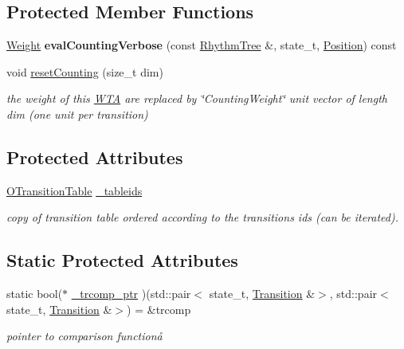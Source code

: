 \subsection*{Protected Member Functions}
\begin{DoxyCompactItemize}
\item 
\mbox{\hyperlink{classWeight}{Weight}} {\bfseries eval\+Counting\+Verbose} (const \mbox{\hyperlink{classRhythmTree}{Rhythm\+Tree}} \&, state\+\_\+t, \mbox{\hyperlink{classPosition}{Position}}) const
\item 
void \mbox{\hyperlink{group__schemata_ga5c94f5191975a32e951e7d39ac606dc0}{reset\+Counting}} (size\+\_\+t dim)
\begin{DoxyCompactList}\small\item\em the weight of this \mbox{\hyperlink{classWTA}{W\+TA}} are replaced by \char`\"{}\+Counting\+Weight\char`\"{} unit vector of length dim (one unit per transition) \end{DoxyCompactList}\end{DoxyCompactItemize}
\subsection*{Protected Attributes}
\begin{DoxyCompactItemize}
\item 
\mbox{\label{classCountingWTA_afb1577fedda586fb3c97df730b8d4100}} 
\mbox{\hyperlink{group__schemata_ga34fd7500c532fc3af1419927d6102bb4}{O\+Transition\+Table}} \mbox{\hyperlink{classCountingWTA_afb1577fedda586fb3c97df730b8d4100}{\+\_\+tableids}}
\begin{DoxyCompactList}\small\item\em copy of transition table ordered according to the transition\textquotesingle{}s ids (can be iterated). \end{DoxyCompactList}\end{DoxyCompactItemize}
\subsection*{Static Protected Attributes}
\begin{DoxyCompactItemize}
\item 
static bool($\ast$ \mbox{\hyperlink{group__schemata_ga170bee814ca8089ab27a574b1f47281c}{\+\_\+trcomp\+\_\+ptr}} )(std\+::pair$<$ state\+\_\+t, \mbox{\hyperlink{classTransition}{Transition}} \&$>$, std\+::pair$<$ state\+\_\+t, \mbox{\hyperlink{classTransition}{Transition}} \&$>$) = \&trcomp
\begin{DoxyCompactList}\small\item\em pointer to comparison functionå \end{DoxyCompactList}\end{DoxyCompactItemize}
